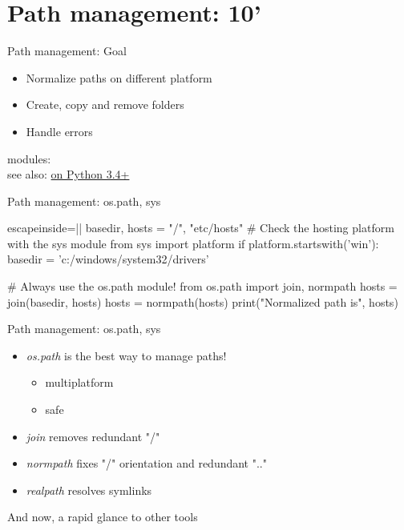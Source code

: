 \section{Path management: 10'}

\begin{pyframe}{Path management: Goal}
\Large
\begin{itemize}
\item Normalize paths on different platform
\item Create, copy and remove folders
\item Handle errors
\end{itemize}
modules:  \\
see also: \href{https://docs.python.org/3/library/pathlib.html}{ on Python 3.4+}
\end{pyframe}

\begin{pyframe}{Path management: os.path, sys}
\begin{pycode*}{escapeinside=||}
basedir, hosts = "/", "etc/hosts"
# Check the hosting platform with the sys module
from sys import platform
if platform.startswith('win'):
    basedir = 'c:/windows/system32/drivers'

# Always use the os.path module!
from os.path import join, normpath
hosts = join(basedir, hosts)
hosts = normpath(hosts)
print("Normalized path is", hosts)
\end{pycode*}
\end{pyframe}

\begin{pyframe}{Path management: os.path, sys}
\Large
\begin{itemize}
\item \emph{os.path} is the best way to manage paths!
\begin{itemize}
 \Large
 \item multiplatform
 \item safe
 \end{itemize}

\item \emph{join} removes redundant "/"
\item \emph{normpath} fixes "/" orientation and redundant ".."
\item \emph{realpath} resolves symlinks
\end{itemize}
And now, a rapid glance to other tools \ellipsis
\end{pyframe}

